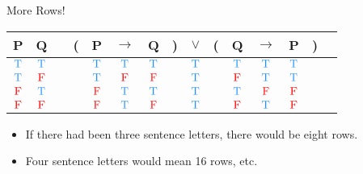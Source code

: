 \documentclass[
  ignorenonframetext,
]{beamer}
\providecommand{\tightlist}{%
  \setlength{\itemsep}{0pt}\setlength{\parskip}{0pt}}
\renewcommand{\,}{\text{, }}
\def\True{\textcolor{dodgerblue}{\text{T}}}
\def\False{\textcolor{red}{\text{F}}}
\begin{document}
\begin{frame}{More Rows!}
\protect\hypertarget{more-rows}{}

\begin{center}
\begin{tabular}{@{ }c@{ }@{ }c | c@{ }@{}c@{}@{ }c@{ }@{ }c@{ }@{ }c@{ }@{}c@{}@{ }c@{ }@{}c@{}@{ }c@{ }@{ }c@{ }@{ }c@{ }@{}c@{}@{ }c}
P & Q &  & ( & P & $\rightarrow$ & Q & ) & $\lor$ & ( & Q & $\rightarrow$ & P & ) & \\
\hline 
$\True$ & $\True$ &  &  & $\True$ & $\True$ & $\True$ &  & \textcolor{red}{$\True$} &  & $\True$ & $\True$ & $\True$ &  & \\
$\True$ & $\False$ &  &  & $\True$ & $\False$ & $\False$ &  & \textcolor{red}{$\True$} &  & $\False$ & $\True$ & $\True$ &  & \\
$\False$ & $\True$ &  &  & $\False$ & $\True$ & $\True$ &  & \textcolor{red}{$\True$} &  & $\True$ & $\False$ & $\False$ &  & \\
$\False$ & $\False$ &  &  & $\False$ & $\True$ & $\False$ &  & \textcolor{red}{$\True$} &  & $\False$ & $\True$ & $\False$ &  & \\
\end{tabular}
\bigskip
\end{center}

\begin{itemize}
\tightlist
\item
  If there had been three sentence letters, there would be eight rows.
\item
  Four sentence letters would mean 16 rows, etc.
\end{itemize}

\end{frame}
\end{document}
